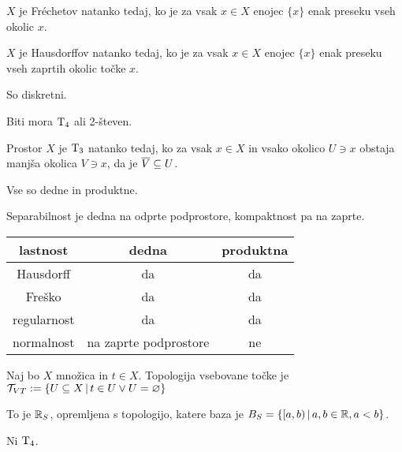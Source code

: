 
$X$ je Fréchetov natanko tedaj, ko je za vsak $x \in X$ enojec $\{x\}$
enak preseku vseh okolic $x$.

$X$ je Hausdorffov natanko tedaj, ko je za vsak $x \in X$ enojec $\{x\}$
enak preseku vseh zaprtih okolic točke $x$.


So diskretni.


Biti mora $\text{T}_{4}$ ali 2-števen.


Prostor $X$ je $\text{T}_{3}$ natanko tedaj, ko za vsak $x \in X$ in vsako
okolico $U \ni x$ obstaja manjša okolica $V \ni x$, da je $\overline{V} \subseteq U$.


Vse so dedne in produktne.


Separabilnost je dedna na odprte podprostore, kompaktnost pa na zaprte.


\begin{table}[h!]
\centering
\begin{tabular}{|c|c|c|}
\hline
lastnost       & dedna                 & produktna \\
\hline
Hausdorff      & da                     & da         \\
Freško         & da                     & da         \\
regularnost    & da                     & da         \\
normalnost     & na zaprte podprostore & ne         \\
\hline
\end{tabular}
\end{table}



Naj bo $X$ množica in $t \in X$. Topologija vsebovane točke je
$\mathcal{T}_{VT} := \{ U \subseteq X \,|\, t \in U \lor U = \varnothing \}$


To je $\mathbb{R}_S$, opremljena s topologijo, katere baza je
$B_S = \{[a, b) \,|\, a,b \in \mathbb{R}, a < b\}$.

Ni $\text{T}_{4}$.
